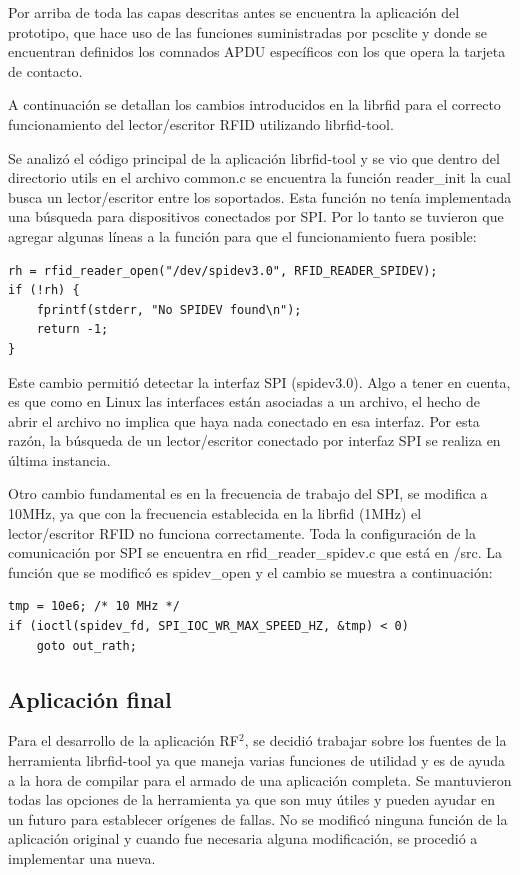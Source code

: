 \bigskip
{}
Por arriba de toda las capas descritas antes se encuentra la aplicación del prototipo, que hace uso de las funciones suministradas por pcsclite y donde se encuentran definidos los comnados APDU específicos con los que opera la tarjeta de contacto.


\bigskip
{}
A continuación se detallan los cambios introducidos en la librfid para el correcto funcionamiento del lector/escritor RFID utilizando librfid-tool.

\bigskip
Se analizó el código principal de la aplicación librfid-tool y se vio que dentro del directorio utils en el archivo common.c se encuentra la función reader\_init la cual busca un lector/escritor entre los soportados. Esta función no tenía implementada una búsqueda para dispositivos conectados por SPI. Por lo tanto se tuvieron que agregar algunas líneas a la función para que el funcionamiento fuera posible:

\begin{verbatim}
rh = rfid_reader_open("/dev/spidev3.0", RFID_READER_SPIDEV);
if (!rh) {
    fprintf(stderr, "No SPIDEV found\n");
    return -1;
}
\end{verbatim}

Este cambio permitió detectar la interfaz SPI (spidev3.0). Algo a tener en cuenta, es que como en Linux las interfaces están asociadas a un archivo, el hecho de abrir el archivo no implica que haya nada conectado en esa interfaz. Por esta razón, la búsqueda de un lector/escritor conectado por interfaz SPI se realiza en última instancia.

\bigskip
Otro cambio fundamental es en la frecuencia de trabajo del SPI, se modifica a 10MHz, ya que con la frecuencia establecida en la librfid (1MHz) el lector/escritor RFID no funciona correctamente. Toda la configuración de la comunicación por SPI se encuentra en rfid\_reader\_spidev.c que está en /src.
La función que se modificó es spidev\_open y el cambio se muestra a continuación:

\begin{verbatim}
tmp = 10e6; /* 10 MHz */
if (ioctl(spidev_fd, SPI_IOC_WR_MAX_SPEED_HZ, &tmp) < 0)
    goto out_rath;
\end{verbatim}

\subsection{Aplicación final}

Para el desarrollo de la aplicación RF$^{2}$, se decidió trabajar sobre los fuentes de la herramienta librfid-tool ya que maneja varias funciones de utilidad y es de ayuda a la hora de compilar para el armado de una aplicación completa. Se mantuvieron todas las opciones de la herramienta ya que son muy útiles y pueden ayudar en un futuro para establecer orígenes de fallas. No se modificó ninguna función de la aplicación original y cuando fue necesaria alguna modificación, se procedió a implementar una nueva.


